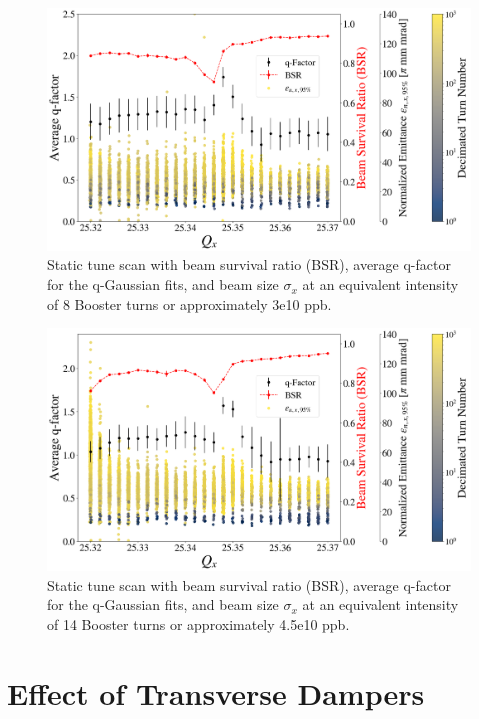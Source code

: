 \begin{figure}[H]
    \centering
    \includegraphics[width=\columnwidth]{chapter6/static8turns_emittance_dampersOFF.png}
    \caption{Static tune scan with beam survival ratio (BSR), average q-factor for the q-Gaussian fits, and beam size $\sigma_x$ at an equivalent intensity of 8 Booster turns or approximately 3e10 ppb.}
    \label{fig:static8_q}
\end{figure}

\begin{figure}[H]
    \centering
    \includegraphics[width=\columnwidth]{chapter6/static14turns_emittance_dampersOFF.png}
    \caption{Static tune scan with beam survival ratio (BSR), average q-factor for the q-Gaussian fits, and beam size $\sigma_x$ at an equivalent intensity of 14 Booster turns or approximately 4.5e10 ppb.}
    \label{fig:static14_q}
\end{figure}

\section{Effect of Transverse Dampers}

